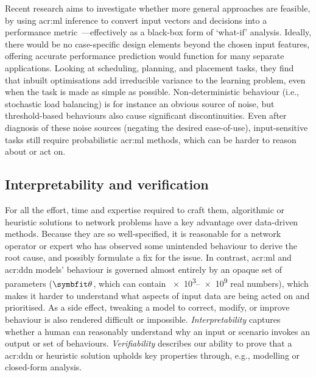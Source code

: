 Recent research aims to investigate whether more general approaches are feasible, by using \gls{acr:ml} inference to convert input vectors and decisions into a performance metric~\parencite{DBLP:conf/nsdi/FuGMR21}---effectively as a black-box form of `what-if' analysis.
Ideally, there would be no case-specific design elements beyond the chosen input features, offering accurate performance prediction would function for many separate applications.
Looking at scheduling, planning, and placement tasks, they find that inbuilt optimisations add irreducible variance to the learning problem, even when the task is made as simple as possible.
Non-deterministic behaviour (i.e., stochastic load balancing) is for instance an obvious source of noise, but threshold-based behaviours also cause significant discontinuities.
Even after diagnosis of these noise sources (negating the desired ease-of-use), input-sensitive tasks still require probabilistic \gls{acr:ml} methods, which can be harder to reason about or act on.

\subsection{Interpretability and verification}
For all the effort, time and expertise required to craft them, algorithmic or heuristic solutions to network problems have a key advantage over data-driven methods.
Because they are so well-specified, it is reasonable for a network operator or expert who has observed some unintended behaviour to derive the root cause, and possibly formulate a fix for the issue.
In contrast, \gls{acr:ml} and \gls{acr:ddn} models' behaviour is governed almost entirely by an opaque set of parameters ($\wvec{}$, which can contain \numrange{e3}{e9} real numbers), which makes it harder to understand what aspects of input data are being acted on and prioritised.
As a side effect, tweaking a model to correct, modify, or improve behaviour is also rendered difficult or impossible.
\emph{Interpretability} captures whether a human can reasonably understand why an input or scenario invokes an output or set of behaviours.
\emph{Verifiability} describes our ability to prove that a \gls{acr:ddn} or heuristic solution upholds key properties through, e.g., modelling or closed-form analysis.

